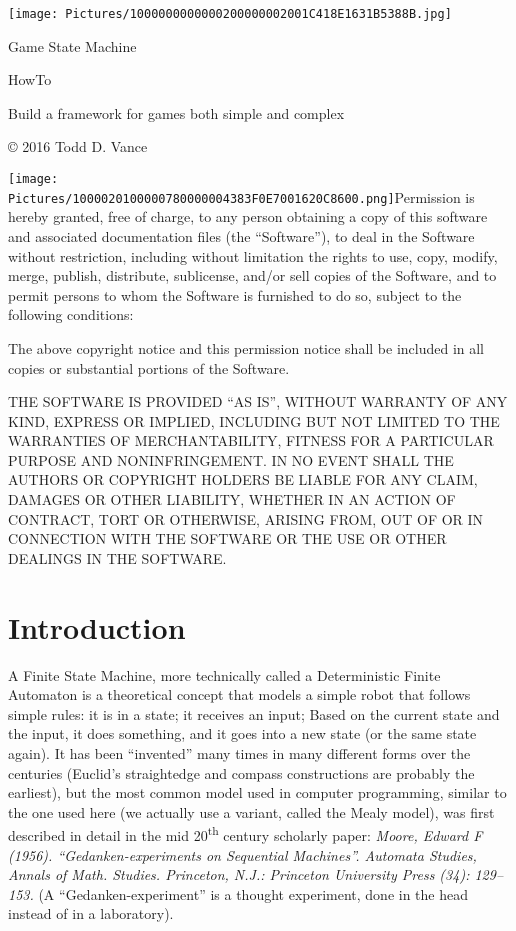 
\texttt{[image: Pictures/1000000000000200000002001C418E1631B5388B.jpg]}

Game State Machine

HowTo

Build a framework for games both simple and complex

© 2016 Todd D. Vance

\texttt{[image: Pictures/1000020100000780000004383F0E7001620C8600.png]}Permission
is hereby granted, free of charge, to any person obtaining a copy of
this software and associated documentation files (the ``Software''), to
deal in the Software without restriction, including without limitation
the rights to use, copy, modify, merge, publish, distribute, sublicense,
and/or sell copies of the Software, and to permit persons to whom the
Software is furnished to do so, subject to the following conditions:

The above copyright notice and this permission notice shall be included
in all copies or substantial portions of the Software.

THE SOFTWARE IS PROVIDED ``AS IS'', WITHOUT WARRANTY OF ANY KIND,
EXPRESS OR IMPLIED, INCLUDING BUT NOT LIMITED TO THE WARRANTIES OF
MERCHANTABILITY, FITNESS FOR A PARTICULAR PURPOSE AND NONINFRINGEMENT.
IN NO EVENT SHALL THE AUTHORS OR COPYRIGHT HOLDERS BE LIABLE FOR ANY
CLAIM, DAMAGES OR OTHER LIABILITY, WHETHER IN AN ACTION OF CONTRACT,
TORT OR OTHERWISE, ARISING FROM, OUT OF OR IN CONNECTION WITH THE
SOFTWARE OR THE USE OR OTHER DEALINGS IN THE SOFTWARE.

\section{}\label{section}

\section[Introduction]{\texorpdfstring{\protect\hypertarget{anchor}{}{}Introduction}{Introduction}}\label{introduction}

A Finite State Machine, more technically called a Deterministic Finite
Automaton is a theoretical concept that models a simple robot that
follows simple rules: it is in a state; it receives an input; Based on
the current state and the input, it does something, and it goes into a
new state (or the same state again). It has been ``invented'' many times
in many different forms over the centuries (Euclid's straightedge and
compass constructions are probably the earliest), but the most common
model used in computer programming, similar to the one used here (we
actually use a variant, called the Mealy model), was first described in
detail in the mid 20\textsuperscript{th} century scholarly paper:
\emph{Moore, Edward F (1956). ``Gedanken-experiments on Sequential
Machines''. Automata Studies, Annals of Math. Studies. Princeton, N.J.:
Princeton University Press (34): 129--153.} (A ``Gedanken-experiment''
is a thought experiment, done in the head instead of in a laboratory).

